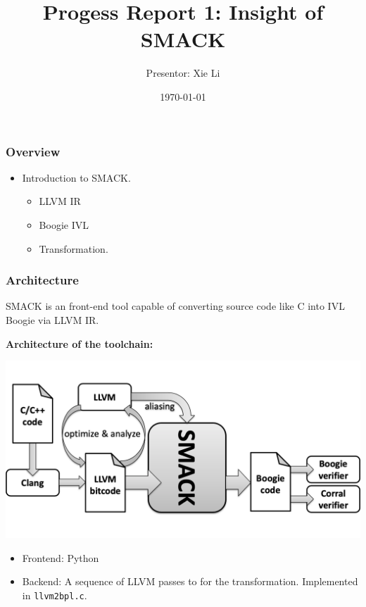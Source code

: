 \documentclass[11pt]{beamer}
\title{Progess Report 1: Insight of SMACK}
\date{\today}
\author{Presentor: Xie Li}
\begin{document}
\maketitle

\begin{frame}\frametitle{Overview}
\begin{itemize}
\item Introduction to SMACK.
\begin{itemize}
\item LLVM IR
\item Boogie IVL
\item Transformation.
\end{itemize}

\end{itemize}
\end{frame}

\begin{frame}\frametitle{Architecture}

SMACK is an front-end tool capable of converting source code like C into IVL Boogie via LLVM IR.

\textbf{Architecture of the toolchain:}

\begin{center}
\includegraphics[scale=0.20]{smack_arch.png}
\end{center}


\begin{itemize}
\item Frontend: Python

\item Backend: A sequence of LLVM passes to for the transformation. Implemented in \texttt{llvm2bpl.c}.


\end{itemize}

\end{frame}
\end{document}
